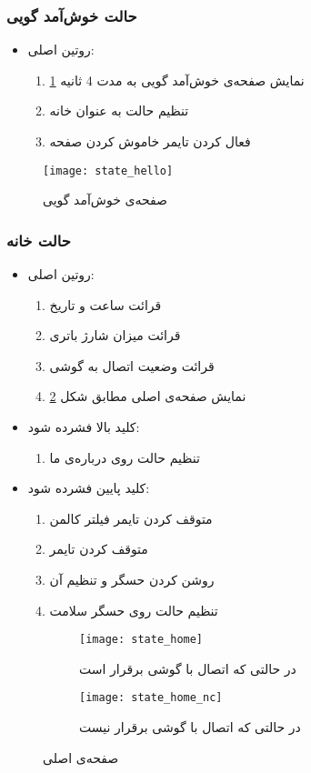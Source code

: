 \subsubsection{حالت خوش‌آمد گویی}
\begin{itemize}
	\item روتین اصلی:
	\begin{enumerate}
		\item نمایش صفحه‌ی خوش‌آمد گویی به مدت 4 ثانیه \ref{fig:state-hello}
		\item تنظیم حالت به عنوان خانه
		\item فعال کردن تایمر خاموش کردن صفحه
	\end{enumerate}
\end{itemize}
	\begin{figure}[h]
		\centering
		\texttt{[image: state\_hello]}
		\caption{صفحه‌ی خوش‌آمد گویی}
		\label{fig:state-hello}
	\end{figure}

\subsubsection{حالت خانه}
\begin{itemize}
	\item روتین اصلی:
	\begin{enumerate}
		\item قرائت ساعت و تاریخ
		\item قرائت میزان شارژ باتری
		\item قرائت وضعیت اتصال به گوشی
		\item نمایش صفحه‌ی اصلی مطابق شکل \ref{fig:state-home}
	\end{enumerate}
	\item کلید بالا فشرده شود:
	\begin{enumerate}
		\item تنظیم حالت روی درباره‌ی ما
	\end{enumerate}
	\item کلید پایین فشرده شود:
	\begin{enumerate}
		\item متوقف کردن تایمر فیلتر کالمن
		\item متوقف کردن تایمر 
		\item روشن کردن حسگر  و تنظیم آن
		\item تنظیم حالت روی حسگر سلامت
	\end{enumerate}
\end{itemize}
	\begin{figure}[h]
		\centering
		\begin{subfigure}{0.4\textwidth}
			\centering
			\texttt{[image: state\_home]}
			\caption{در حالتی که اتصال با گوشی برقرار است}
		\end{subfigure}
		\begin{subfigure}{0.4\textwidth}
			\centering
			\texttt{[image: state\_home\_nc]}
			\caption{در حالتی که اتصال با گوشی برقرار نیست}
		\end{subfigure}
		\caption{صفحه‌ی اصلی}
		\label{fig:state-home}
	\end{figure}

